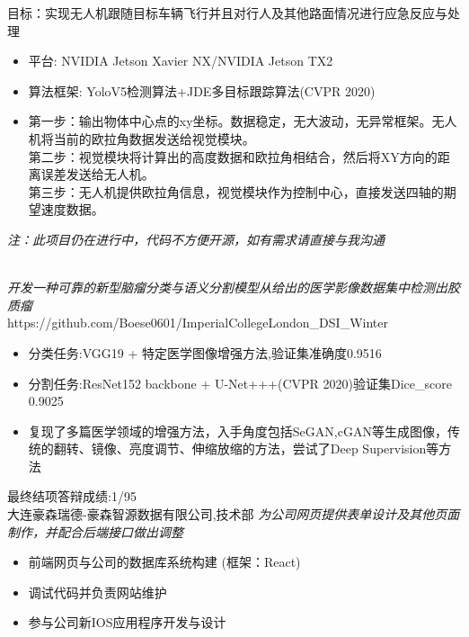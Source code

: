 \documentclass{resume}
\begin{document}
\begin{onehalfspacing}
目标：实现无人机跟随目标车辆飞行并且对行人及其他路面情况进行应急反应与处理
\begin{itemize}
  \item 平台: NVIDIA Jetson Xavier NX/NVIDIA Jetson TX2
  \item 算法框架: YoloV5检测算法+JDE多目标跟踪算法(CVPR 2020)
  \item 第一步：输出物体中心点的xy坐标。数据稳定，无大波动，无异常框架。无人机将当前的欧拉角数据发送给视觉模块。\\
  第二步：视觉模块将计算出的高度数据和欧拉角相结合，然后将XY方向的距离误差发送给无人机。\\
  第三步：无人机提供欧拉角信息，视觉模块作为控制中心，直接发送四轴的期望速度数据。
\end{itemize}
\textit{注：此项目仍在进行中，代码不方便开源，如有需求请直接与我沟通}
\end{onehalfspacing}\\
\textit{开发一种可靠的新型脑瘤分类与语义分割模型从给出的医学影像数据集中检测出胶质瘤}\\
https://github.com/Boese0601/ImperialCollegeLondon\_DSI\_Winter
\begin{itemize}
	\item 分类任务:VGG19 + 特定医学图像增强方法,验证集准确度0.9516
	\item 分割任务:ResNet152 backbone + U-Net+++(CVPR 2020)验证集Dice\_score 0.9025
	\item 复现了多篇医学领域的增强方法，入手角度包括SeGAN,cGAN等生成图像，传统的翻转、镜像、亮度调节、伸缩放缩的方法，尝试了Deep Supervision等方法
\end{itemize}
最终结项答辩成绩:1/95\\
 {大连豪森瑞德-豪森智源数据有限公司,技术部}
\textit{为公司网页提供表单设计及其他页面制作，并配合后端接口做出调整}
\begin{itemize}
	\item 前端网页与公司的数据库系统构建 (框架：React)
	\item 调试代码并负责网站维护
	\item 参与公司新IOS应用程序开发与设计
\end{itemize}
\end{document}
